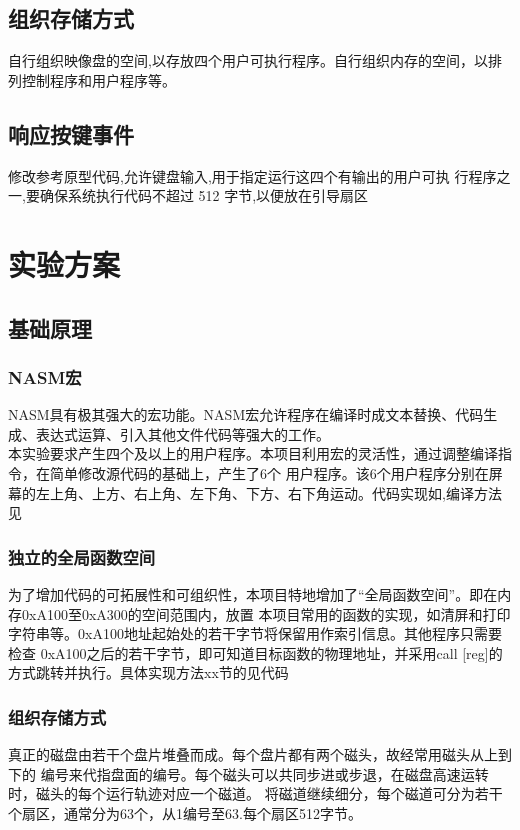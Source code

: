 \documentclass[a4paper]{article}
\newcommand{\codev}[1]{\textsf{#1}}
\begin{document}
    \subsection{组织存储方式}
    自行组织映像盘的空间,以存放四个用户可执行程序。自行组织内存的空间，以排列控制程序和用户程序等。
    \subsection{响应按键事件}
    修改参考原型代码,允许键盘输入,用于指定运行这四个有输出的用户可执
    行程序之一,要确保系统执行代码不超过 512 字节,以便放在引导扇区
\section{实验方案}
    \subsection{基础原理}
    \subsubsection{NASM宏} 
    NASM具有极其强大的宏功能。NASM宏允许程序在编译时成文本替换、代码生成、表达式运算、引入其他文件代码等强大的工作。\\
    
    本实验要求产生四个及以上的用户程序。本项目利用宏的灵活性，通过调整编译指令，在简单修改源代码的基础上，产生了6个
    用户程序。该6个用户程序分别在屏幕的左上角、上方、右上角、左下角、下方、右下角运动。代码实现如,编译方法见%
    \subsubsection{独立的全局函数空间} \label{subsec:globalFunc}
    为了增加代码的可拓展性和可组织性，本项目特地增加了``全局函数空间''。即在内存0xA100至0xA300的空间范围内，放置
    本项目常用的函数的实现，如清屏和打印字符串等。0xA100地址起始处的若干字节将保留用作索引信息。其他程序只需要检查
    0xA100之后的若干字节，即可知道目标函数的物理地址，并采用\codev{call [reg]}的方式跳转并执行。具体实现方法xx节的见代码%
    \subsubsection{组织存储方式}
    真正的磁盘由若干个盘片堆叠而成。每个盘片都有两个磁头，故经常用磁头从上到下的
    编号来代指盘面的编号。每个磁头可以共同步进或步退，在磁盘高速运转时，磁头的每个运行轨迹对应一个磁道。
    将磁道继续细分，每个磁道可分为若干个扇区，通常分为63个，从1编号至63.每个扇区512字节。\\
    
\end{document}
